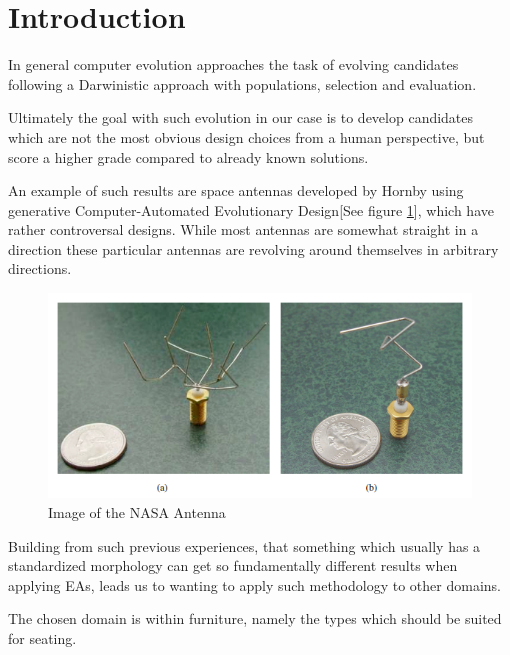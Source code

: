 \section{Introduction}
In general computer evolution approaches the task of evolving candidates
following a Darwinistic approach with populations, selection and
evaluation\cite{paper:ev3}.

Ultimately the goal with such evolution in our case is to develop candidates
which are not the most obvious design choices from a human perspective, but
score a higher grade compared to already known solutions.

An example of such results are space antennas developed by
Hornby\cite{paper:ev4} using generative Computer-Automated Evolutionary
Design[See figure \ref{fig:nasa_antenna}], which have rather controversal
designs. While most antennas are somewhat straight in a direction these
particular antennas are revolving around themselves in arbitrary directions.

\begin{figure}[ht]
\includegraphics[scale=.7]{content/img/space_antenna}
\caption{Image of the NASA Antenna \cite{paper:ev4} }
\label{fig:nasa_antenna}
\end{figure}

Building from such previous experiences, that something which usually has a
standardized morphology can get so fundamentally different results when applying
EAs, leads us to wanting to apply such methodology to other domains.

The chosen domain is within furniture, namely the types which should be suited
for seating.

